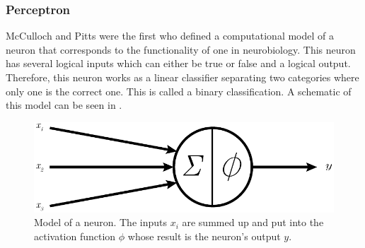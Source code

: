\subsubsection{Perceptron}
\label{sec:mlp-theorie}
McCulloch and Pitts\cite{McCulloch1988} were the first who defined a computational model of a neuron that corresponds to the functionality of one in neurobiology.
This neuron has several logical inputs which can either be true or false and a logical output.
Therefore, this neuron works as a linear classifier separating two categories where only one is the correct one.
This is called a binary classification.
A schematic of this model can be seen in .
\begin{figure}
	\centering
	\includegraphics{images/neuron.pdf}
	\caption[Model of a Neuron]{Model of a neuron. The inputs $x_i$ are summed up and put into the activation function $\phi$ whose result is the neuron's output $y$.}
	\label{fig:neuron}
\end{figure}

